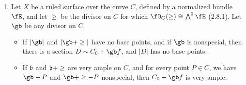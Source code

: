 \documentclass[a4paper]{article}
\begin{document}
\begin{enumerate} [label=\textbf{\arabic*.}, leftmargin=0em]
    \item Let $X$ be a ruled surface over the curve $C$, defined by a normalized bundle $\fE$, and let $\ge$ be the divisor on $C$ for which $\fO_C(\ge) \cong \bigwedge^2 \fE$ (2.8.1).
          Let $\gb$ be any divisor on $C$.
          \begin{itemize}
              \item[(a)] If $|\gb|$ and $|\gb + \ge|$ have no base points, and if $\gb$ is nonspecial, then there is a section $D \sim C_0 + \gb f$, and $|D|$ has no base points.
              \item[(b)] If $\mathfrak{b}$ and $\mathfrak{b} + \ge$ are very ample on $C$, and for every point $P \in C$, we have $\gb - P$ and $\gb + \ge - P$ nonspecial, then $C_0 + \gb f$ is very ample.
          \end{itemize}


\end{enumerate}
\end{document}
